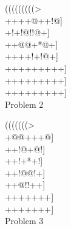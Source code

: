 \documentclass[mcrownvopaper,10pt,twopage,onecolumn,final]{memoir}
\begin{document}
\begin{figure}[ht]
    \begin{minipage}[c]{0.50\linewidth}
        \centering    
        {\gnos%
        (((((((((>\\
        ++++@++!@]\\
        +!+!@!!@+]\\
        ++@@+*@+]\\
        ++++!+!@+]\\
        +++++++++]\\
        +++++++++]\\
        +++++++++]\\
        }
        Problem 2
    \end{minipage}%
    \begin{minipage}[c]{0.50\linewidth}
        \centering    
        {\gnos%
        (((((((>\\
        +@@+++@]\\
        ++!@+@!]\\
        ++!+*+!]\\
        ++!@@!+]\\
        ++@!!++]\\
        +++++++]\\
        +++++++]\\
        }
        Problem 3
    \end{minipage}%
\end{figure}  
\newpage
\end{document}
